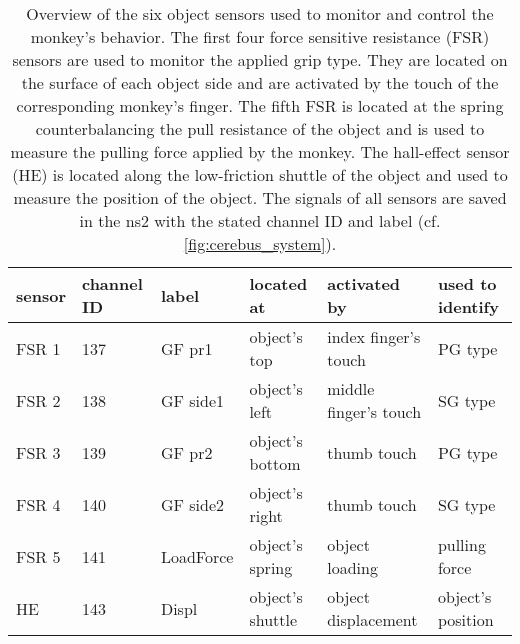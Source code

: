 {\begin{table}[]
\footnotesize
\begin{tabular}{|l|l|l|l|l|l|}
\hline
sensor & channel ID & label     & located at       & activated by          & used to identify  \\ \hline
FSR 1  & 137        & GF pr1    & object’s top     & index finger’s touch  & PG type           \\ \hline
FSR 2  & 138        & GF side1  & object’s left    & middle finger’s touch & SG type           \\ \hline
FSR 3  & 139        & GF pr2    & object’s bottom  & thumb touch           & PG type           \\ \hline
FSR 4  & 140        & GF side2  & object’s right   & thumb touch           & SG type           \\ \hline
FSR 5  & 141        & LoadForce & object’s spring  & object loading        & pulling force     \\ \hline
HE     & 143        & Displ     & object's shuttle & object displacement   & object’s position \\ \hline
\end{tabular}
 \caption[Overview of six objects sensonsr to monitor and control the monkey's behavior]{Overview of the six object sensors used to monitor and control the monkey's behavior. The first four force sensitive resistance (FSR) sensors are used to monitor the applied grip type. They are located on the surface of each object side and are activated by the touch of the corresponding monkey's finger. The fifth FSR is located at the spring counterbalancing the pull resistance of the object and is used to measure the pulling force applied by the monkey. The hall-effect sensor (HE) is located along the low-friction shuttle of the object and used to measure the position of the object. The signals of all sensors are saved in the ns2 with the stated channel ID and label (cf. \cref{fig:cerebus_system}).}
 \label{tab:overview_sensors}
\end{table}


}
